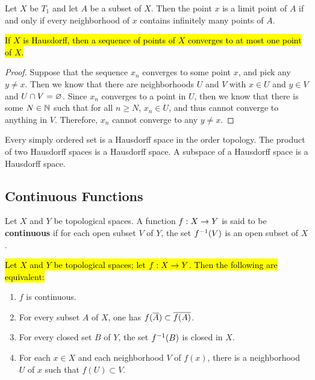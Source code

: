 \vs

\dfn Let $X$ be $T_1$ and let $A$ be a subset of $X$. Then the point $x$ is a limit point of $A$ if and only if every neighborhood of $x$ contains infinitely many points of $A$.

\vs

\begin{thm}
\hl{If $X$ is Hausdorff, then a sequence of points of $X$ converges to at most one point of $X$.}
\end{thm}

\begin{proof}
Suppose that the sequence $x_n$ converges to some point $x$, and pick any $y\neq x$. Then we know that there are neighborhoods $U$ and $V$ with $x\in U$ and $y\in V$ and $U\cap V = \varnothing$. Since $x_n$ converges to a point in $U$, then we know that there is some $N\in \mathbb{N}$ such that for all $n\geq N$, $x_n\in U$, and thus cannot converge to anything in $V$. Therefore, $x_n$ cannot converge to any $y\neq x$.
\end{proof}

\begin{thm}
Every simply ordered set is a Hausdorff space in the order topology. The product of two Hausdorff spaces is a Hausdorff space. A subspace of a Hausdorff space is a Hausdorff space.
\end{thm}

\subsection{Continuous Functions}\nl
\setcounter{section}{18}
\setcounter{thm}{0}

\vs

\dfn Let $X$ and $Y$ be topological spaces. A function $f:X\rightarrow Y$ is said to be \textbf{continuous} if for each open subset $V$ of $Y$, the set $f^{-1}(V)$ is an open subset of $X$.

\vs

\begin{thm}
\hl{Let $X$ and $Y$ be topological spaces; let $f:X\rightarrow Y$. Then the following are equivalent:}
\begin{enumerate}
    \item $f$ is continuous.
    \item For every subset $A$ of $X$, one has $f(\overline A) \subset \overline{f(A)}$.
    \item For every closed set $B$ of $Y$, the set $f^{-1} (B)$ is closed in $X$.
    \item For each $x\in X$ and each neighborhood $V$ of $f(x)$, there is a neighborhood $U$ of $x$ such that $f(U)\subset V$.
\end{enumerate}
\end{thm}

